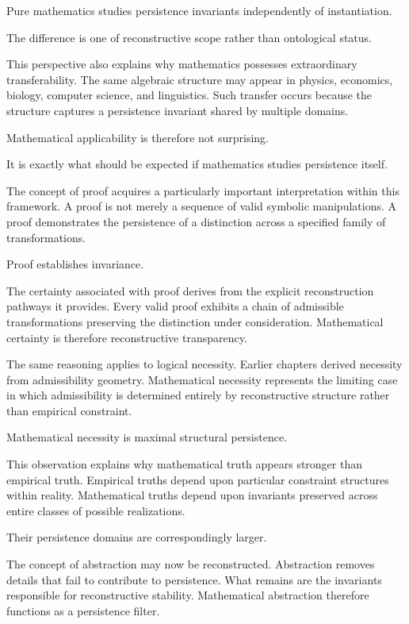 \documentclass[12pt,oneside]{article}
\theoremstyle{definition}
\begin{document}
Pure mathematics studies persistence invariants independently of instantiation.

The difference is one of reconstructive scope rather than ontological status.

This perspective also explains why mathematics possesses extraordinary transferability. The same algebraic structure may appear in physics, economics, biology, computer science, and linguistics. Such transfer occurs because the structure captures a persistence invariant shared by multiple domains.

Mathematical applicability is therefore not surprising.

It is exactly what should be expected if mathematics studies persistence itself.

The concept of proof acquires a particularly important interpretation within this framework. A proof is not merely a sequence of valid symbolic manipulations. A proof demonstrates the persistence of a distinction across a specified family of transformations.

Proof establishes invariance.

The certainty associated with proof derives from the explicit reconstruction pathways it provides. Every valid proof exhibits a chain of admissible transformations preserving the distinction under consideration. Mathematical certainty is therefore reconstructive transparency.

The same reasoning applies to logical necessity. Earlier chapters derived necessity from admissibility geometry. Mathematical necessity represents the limiting case in which admissibility is determined entirely by reconstructive structure rather than empirical constraint.

Mathematical necessity is maximal structural persistence.

This observation explains why mathematical truth appears stronger than empirical truth. Empirical truths depend upon particular constraint structures within reality. Mathematical truths depend upon invariants preserved across entire classes of possible realizations.

Their persistence domains are correspondingly larger.

The concept of abstraction may now be reconstructed. Abstraction removes details that fail to contribute to persistence. What remains are the invariants responsible for reconstructive stability. Mathematical abstraction therefore functions as a persistence filter.
\end{document}
